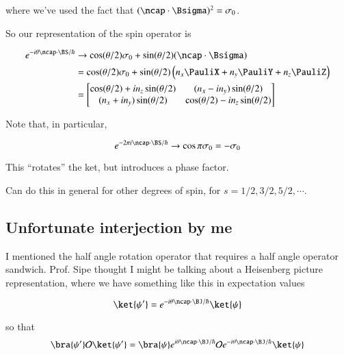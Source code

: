 where we've used the fact that $(\ncap \cdot \Bsigma)^2 = \sigma_0$.

So our representation of the spin operator is

\begin{equation}\label{eqn:qmTwoL15:30}
\begin{aligned}
e^{-i \theta \ncap \cdot \BS/\hbar} 
&\rightarrow
\cos(\theta/2) \sigma_0 + \sin(\theta/2) (\ncap \cdot \Bsigma) \\
&=
\cos(\theta/2) \sigma_0 + \sin(\theta/2) 
\left(n_x \PauliX + n_y \PauliY + n_z \PauliZ \right) \\
&=
\begin{bmatrix}
\cos(\theta/2) +i n_z \sin(\theta/2) & (n_x -i n_y) \sin(\theta/2) \\
(n_x + i n_y) \sin(\theta/2) & \cos(\theta/2) -i n_z \sin(\theta/2) 
\end{bmatrix}
\end{aligned}
\end{equation}

Note that, in particular, 

\begin{equation}\label{eqn:qmTwoL15:50}
e^{-2 \pi i \ncap \cdot \BS/\hbar} \rightarrow \cos\pi \sigma_0 = -\sigma_0
\end{equation}

This ``rotates'' the ket, but introduces a phase factor.

Can do this in general for other degrees of spin, for $s = 1/2, 3/2, 5/2, \cdots$.

\subsection{Unfortunate interjection by me}

I mentioned the half angle rotation operator that requires a half angle operator sandwich.  Prof. Sipe thought I might be talking about a Heisenberg picture representation, where we have something like this in expectation values

\begin{equation}\label{eqn:qmTwoL15:70}
\ket{\psi'} = e^{-i \theta \ncap \cdot \BJ/\hbar} \ket{\psi}
\end{equation}

so that 
\begin{equation}\label{eqn:qmTwoL15:90}
\bra{\psi'}
\mathcal{O}
\ket{\psi'} = \bra{\psi} 
e^{i \theta \ncap \cdot \BJ/\hbar} 
\mathcal{O}
e^{-i \theta \ncap \cdot \BJ/\hbar} 
\ket{\psi}
\end{equation}

